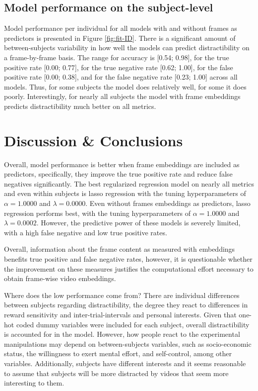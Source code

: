\documentclass[
  man]{apa6}
\begin{document}
\hypertarget{model-performance-on-the-subject-level}{%
\subsection{Model performance on the subject-level}\label{model-performance-on-the-subject-level}}

Model performance per individual for all models with and without frames as predictors is presented in Figure \ref{fig:fit-ID}. There is a significant amount of between-subjects variability in how well the models can predict distractibility on a frame-by-frame basis. The range for accuracy is {[}0.54; 0.98{]}, for the true positive rate {[}0.00; 0.77{]}, for the true negative rate {[}0.62; 1.00{]}, for the false positive rate {[}0.00; 0.38{]}, and for the false negative rate {[}0.23; 1.00{]} across all models. Thus, for some subjects the model does relatively well, for some it does poorly. Interestingly, for nearly all subjects the model with frame embeddings predicts distractibility much better on all metrics.

\hypertarget{discussion-conclusions}{%
\section{Discussion \& Conclusions}\label{discussion-conclusions}}

Overall, model performance is better when frame embeddings are included as predictors, specifically, they improve the true positive rate and reduce false negatives significantly. The best regularized regression model on nearly all metrics and even within subjects is lasso regression with the tuning hyperparameters of \(\alpha = 1.0000\) and \(\lambda = 0.0000\). Even without frames embeddings as predictors, lasso regression performs best, with the tuning hyperparameters of \(\alpha = 1.0000\) and \(\lambda = 0.0002\). However, the predictive power of these models is severely limited, with a high false negative and low true positive rates.

Overall, information about the frame content as measured with embeddings benefits true positive and false negative rates, however, it is questionable whether the improvement on these measures justifies the computational effort necessary to obtain frame-wise video embeddings.

Where does the low performance come from? There are individual differences between subjects regarding distractibility, the degree they react to differences in reward sensitivity and inter-trial-intervals and personal interests. Given that one-hot coded dummy variables were included for each subject, overall distractibility is accounted for in the model. However, how people react to the experimental manipulations may depend on between-subjects variables, such as socio-economic status, the willingness to exert mental effort, and self-control, among other variables. Additionally, subjects have different interests and it seems reasonable to assume that subjects will be more distracted by videos that seem more interesting to them.
\end{document}
